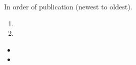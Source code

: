 \newpage
\begin{fullwidth}
  In order of publication (newest to oldest).

  \divider


  \begin{enumerate} \normalsize
  \item  \divider
  \item 
  \end{enumerate}

  \divider


  \begin{itemize} \normalsize
  \item  \divider
  \item 
  \end{itemize}
\end{fullwidth}

\iffalse
\cvsection{Volunteering}
I have been very active at the university outside of the studies. Below are some
things I have volunteered for among other things

\medskip



\divider



\divider


\fi



